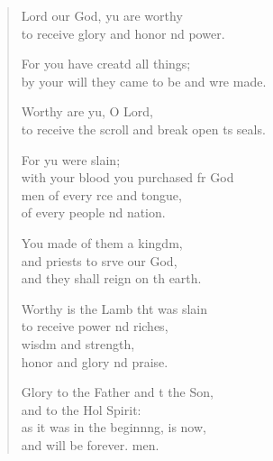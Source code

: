 \settowidth{\versewidth}{to receive the scroll and break open its seals.}
\begin{verse}%
  \begin{patverse}
 Lord our God, yu are worthy\Med\\
to receive glory and honor nd power.

For you have creatd all things;\Med\\
by your will they came to be and wre made.

Worthy are yu, O Lord,\Med\\
to receive the scroll and break open \pointup{\i}ts seals.

For yu were slain;\Med\\
with your blood you purchased fr God\\
men of every rce and tongue,\Med\\
of every people nd nation.

You made of them a kingdm,\Flex\\
and priests to srve our God,\Med\\
and they shall reign on th earth.

Worthy is the Lamb tht was slain\Med\\
to receive power nd riches,\Med\\
wisdm and strength,\\
honor and glory nd praise.

Glory to the Father and t the Son,\Med\\
and to the Hol Spirit:\\
as it was in the beginnng, is now,\Med\\
and will be forever. men.
  \end{patverse}
\end{verse}
